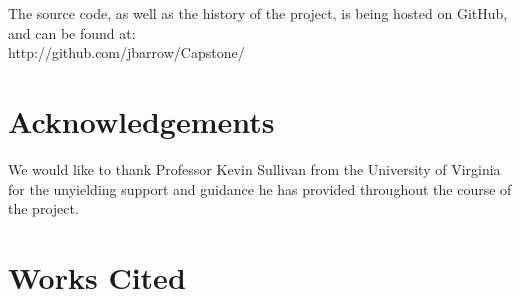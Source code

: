 \documentclass[twocolumn]{article}
\begin{document}
The source code, as well as the history of the project, is being hosted on GitHub, and can be found at:
\\
http://github.com/jbarrow/Capstone/ 

\section{Acknowledgements}

We would like to thank Professor Kevin Sullivan from the University of Virginia for the unyielding support and guidance he has provided throughout the course of the project.

\section{Works Cited}
\end{document}
